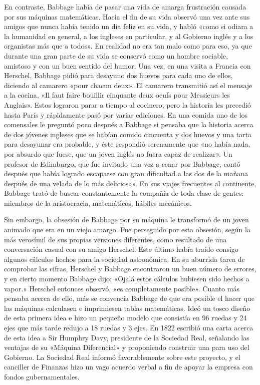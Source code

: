 \documentclass[a4paper, 12pt]{article}
\begin{document}
En contraste, Babbage había de pasar una vida de amarga frustración causada por sus máquinas matemáticas. Hacia el fin de su vida observó una vez ante sus amigos que nunca había tenido un día feliz en su vida, y habló «como si odiara a la humanidad en general, a los ingleses en particular, y al Gobierno inglés y a los organistas más que a todos». En realidad no era tan malo como para eso, ya que durante una gran parte de su vida se conservó como un hombre sociable, amistoso y con un buen sentido del humor. Una vez, en una visita a Francia con Herschel, Babbage pidió para desayuno dos huevos para cada uno de ellos, diciendo al camarero «pour chacun deux». El camarero transmitió así el mensaje a la cocina, «Il faut faire bouillir cinquante deux oeufs pour Messieurs les Anglais». Estos lograron parar a tiempo al cocinero, pero la historia les precedió hasta París y rápidamente pasó por varias ediciones. En una comida uno de los comensales le preguntó poco después a Babbage si pensaba que la historia acerca de dos jóvenes ingleses que se habían comido cincuenta y dos huevos y una tarta para desayunar era probable, y éste respondió serenamente que «no había nada, por absurdo que fuese, que un joven inglés no fuera capaz de realizar». Un profesor de Edimburgo, que  fue invitado una vez a cenar por Babbage, contó después que había logrado escaparse con gran dificultad a las dos de la mañana después de una velada de lo más deliciosa». En sus viajes frecuentes al continente, Babbage trató de buscar constantemente la compañía de toda clase de gentes: miembros de la aristocracia, matemáticos, hábiles mecánicos.

Sin embargo, la obsesión de Babbage por su máquina le transformó de un joven animado que era en un viejo amargo. Fue perseguido por esta obsesión, según la más verosímil de sus propias versiones diferentes, como resultado de una conversación casual con su amigo Herschel. Este último había traído consigo algunos cálculos hechos para la sociedad astronómica. En su aburrida tarea de comprobar las cifras, Herschel y Babbage encontraron un buen número de errores, y en cierto momento Babbage dijo: «Ojalá estos cálculos hubiesen sido hechos a vapor.» Herschel entonces observó, «es completamente posible». Cuanto más pensaba acerca de ello, más se convencia Babbage de que era posible el hacer que las máquinas calculasen e imprimiesen tablas matemáticas. Ideó un tosco diseño de esta primera idea e hizo un pequeño modelo que consistía en 96 ruedas y 24 ejes que más tarde redujo a 18 ruedas y 3 ejes. En 1822 escribió una carta acerca de esta idea a Sir Humphry Davy, presidente de la Sociedad Real, señalando las ventajas de su «Máquina Diferencial» y proponiendo construir una para uso del Gobierno. La Sociedad Real informó favorablemente sobre este proyecto, y el canciller de Finanzas hizo un vago acuerdo verbal a fin de apoyar la empresa con fondos gubernamentales.
\end{document}
